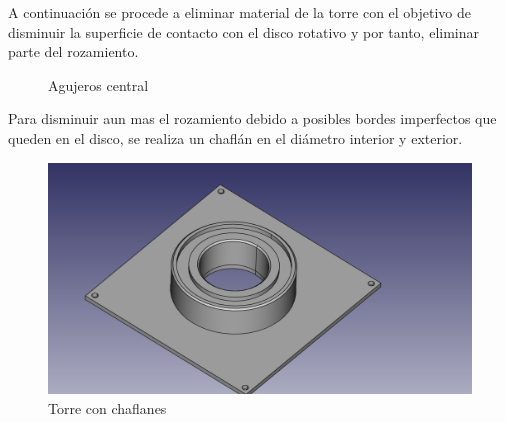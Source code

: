 A continuación se procede a eliminar material de la torre con
el objetivo de disminuir la superficie de contacto con el disco rotativo y por tanto, eliminar parte del rozamiento.

\begin{figure}[H]
\centering
{}
\caption{Agujeros central}
\label{fig:anillo_tapa_superior}
\end{figure}

Para disminuir aun mas el rozamiento debido a posibles bordes imperfectos que queden en el disco, se realiza un chaflán en el diámetro interior y exterior.

\begin{figure}[H]
    \centering
    \includegraphics[width=.9\linewidth]{pictures/Chaflanes.png}
    \caption{Torre con chaflanes}
    \label{fig:chaflanes_tapa_superior}
\end{figure}

